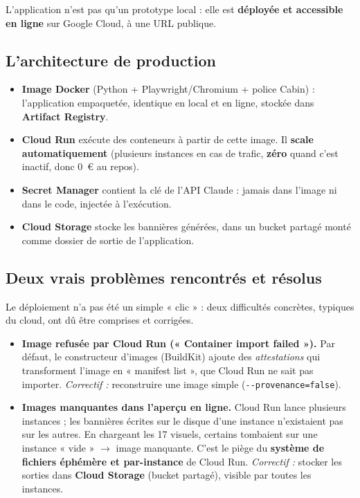 \documentclass[11pt,a4paper]{article}
\begin{document}
L'application n'est pas qu'un prototype local : elle est \textbf{déployée et accessible
en ligne} sur Google Cloud, à une URL publique.

\subsection{L'architecture de production}
\begin{itemize}[leftmargin=1.4em]
  \item \textbf{Image Docker} (Python + Playwright/Chromium + police Cabin) :
        l'application empaquetée, identique en local et en ligne, stockée dans
        \textbf{Artifact Registry}.
  \item \textbf{Cloud Run} exécute des conteneurs à partir de cette image. Il
        \textbf{scale automatiquement} (plusieurs instances en cas de trafic,
        \textbf{zéro} quand c'est inactif, donc 0~€ au repos).
  \item \textbf{Secret Manager} contient la clé de l'API Claude : jamais dans l'image
        ni dans le code, injectée à l'exécution.
  \item \textbf{Cloud Storage} stocke les bannières générées, dans un bucket partagé
        monté comme dossier de sortie de l'application.
\end{itemize}

\subsection{Deux vrais problèmes rencontrés et résolus}
Le déploiement n'a pas été un simple « clic » : deux difficultés concrètes, typiques du
cloud, ont dû être comprises et corrigées.
\begin{itemize}[leftmargin=1.4em]
  \item \textbf{Image refusée par Cloud Run (« Container import failed »).} Par défaut,
        le constructeur d'images (BuildKit) ajoute des \emph{attestations} qui
        transforment l'image en « manifest list », que Cloud Run ne sait pas importer.
        \emph{Correctif :} reconstruire une image simple (\texttt{-{}-provenance=false}).
  \item \textbf{Images manquantes dans l'aperçu en ligne.} Cloud Run lance plusieurs
        instances ; les bannières écrites sur le disque d'une instance n'existaient pas
        sur les autres. En chargeant les 17 visuels, certains tombaient sur une instance
        « vide » \(\rightarrow\) image manquante. C'est le piège du \textbf{système de
        fichiers éphémère et par-instance} de Cloud Run. \emph{Correctif :} stocker les
        sorties dans \textbf{Cloud Storage} (bucket partagé), visible par toutes les
        instances.
\end{itemize}
\end{document}
